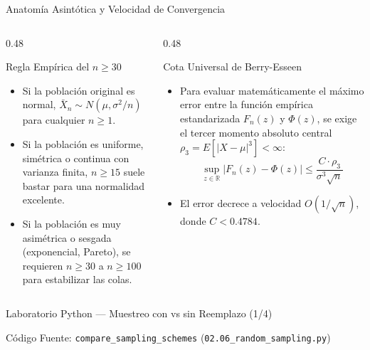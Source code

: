 \documentclass[10pt, aspectratio=169]{beamer}
\begin{document}
\begin{frame}{Anatomía Asintótica y Velocidad de Convergencia}
  \begin{columns}[T]
    \begin{column}{0.48\textwidth}
      \begin{block}{Regla Empírica del $n \ge 30$}
        \small
        \begin{itemize}\itemsep=0.1cm
          \item Si la población original es normal, $\bar{X}_n \sim N(\mu, \sigma^2/n)$ para cualquier $n \ge 1$.
          \item Si la población es uniforme, simétrica o continua con varianza finita, $n \ge 15$ suele bastar para una normalidad excelente.
          \item Si la población es muy asimétrica o sesgada (exponencial, Pareto), se requieren $n \ge 30$ a $n \ge 100$ para estabilizar las colas.
        \end{itemize}
      \end{block}
    \end{column}
    \begin{column}{0.48\textwidth}
      \begin{alertblock}{Cota Universal de Berry-Esseen}
        \small
        \begin{itemize}\itemsep=0.1cm
          \item Para evaluar matemáticamente el máximo error entre la función empírica estandarizada $F_n(z)$ y $\Phi(z)$, se exige el tercer momento absoluto central $\rho_3 = E[|X - \mu|^3] < \infty$:
          $$\sup_{z \in \mathbb{R}} |F_n(z) - \Phi(z)| \le \frac{C \cdot \rho_3}{\sigma^3 \sqrt{n}}$$
          \item El error decrece a velocidad $O(1/\sqrt{n})$, donde $C < 0.4784$.
        \end{itemize}
      \end{alertblock}
    \end{column}
  \end{columns}
\end{frame}

\begin{frame}[fragile]{Laboratorio Python --- Muestreo con vs sin Reemplazo (1/4)}
  \vspace{-0.1cm}
  \begin{block}{Código Fuente: \texttt{compare\_sampling\_schemes} (\texttt{02.06\_random\_sampling.py})}
    
  \end{block}
\end{frame}
\end{document}
